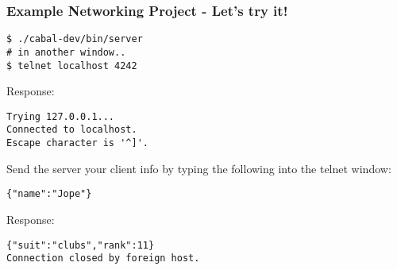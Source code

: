 \documentclass{beamer}
\begin{document}
\begin{frame}[fragile]
\frametitle{Example Networking Project - Let's try it!}

{\small
\begin{verbatim}
$ ./cabal-dev/bin/server
# in another window..
$ telnet localhost 4242
\end{verbatim}
}

Response:

{\small
\begin{verbatim}
Trying 127.0.0.1...
Connected to localhost.
Escape character is '^]'.
\end{verbatim}
}

Send the server your client info by typing the following into the telnet window:

{\small
\begin{verbatim}
{"name":"Jope"}
\end{verbatim}
}

Response:

{\small
\begin{verbatim}
{"suit":"clubs","rank":11}
Connection closed by foreign host.
\end{verbatim}
}

\end{frame}
\end{document}
